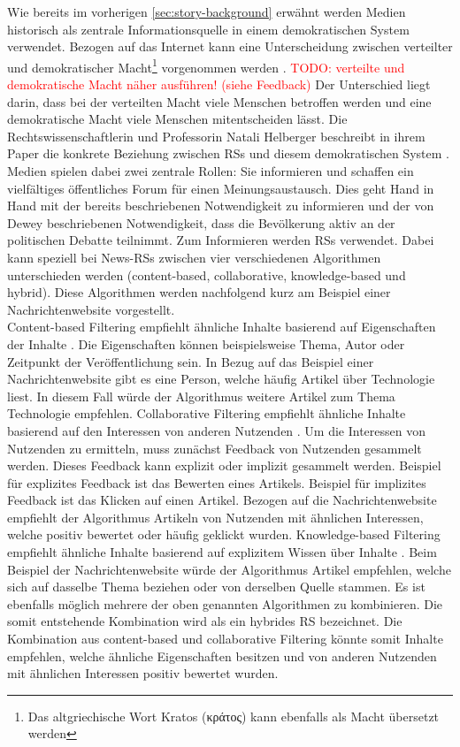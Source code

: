 Wie bereits im vorherigen \autoref{sec:story-background} erwähnt werden Medien historisch als zentrale Informationsquelle in einem demokratischen System verwendet.
Bezogen auf das Internet kann eine Unterscheidung zwischen verteilter und demokratischer Macht\footnote{Das altgriechische Wort Kratos (\textgreek{κράτος}) kann ebenfalls als Macht übersetzt werden} vorgenommen werden \cite{free-speech-algorithmic}.
\textcolor{red}{TODO: verteilte und demokratische Macht näher ausführen! (siehe Feedback)}
Der Unterschied liegt darin, dass bei der verteilten Macht viele Menschen betroffen werden und eine demokratische Macht viele Menschen mitentscheiden lässt.
Die Rechtswissenschaftlerin und Professorin Natali Helberger beschreibt in ihrem Paper die konkrete Beziehung zwischen \acp{RS} und diesem demokratischen System \cite{democratic-role}.
Medien spielen dabei zwei zentrale Rollen: Sie informieren und schaffen ein vielfältiges öffentliches Forum für einen Meinungsaustausch.
Dies geht Hand in Hand mit der bereits beschriebenen Notwendigkeit zu informieren und der von Dewey beschriebenen Notwendigkeit, dass die Bevölkerung aktiv an der politischen Debatte teilnimmt.
Zum Informieren werden \acp{RS} verwendet.
Dabei kann speziell bei News-\acp{RS} zwischen vier verschiedenen Algorithmen unterschieden werden (content-based, collaborative, knowledge-based und hybrid).
Diese Algorithmen werden nachfolgend kurz am Beispiel einer Nachrichtenwebsite vorgestellt. \\

Content-based Filtering empfiehlt ähnliche Inhalte basierend auf Eigenschaften der Inhalte \cite{content-based-rs}.
Die Eigenschaften können beispielsweise Thema, Autor oder Zeitpunkt der Veröffentlichung sein.
In Bezug auf das Beispiel einer Nachrichtenwebsite gibt es eine Person, welche häufig Artikel über Technologie liest.
In diesem Fall würde der Algorithmus weitere Artikel zum Thema Technologie empfehlen.
Collaborative Filtering empfiehlt ähnliche Inhalte basierend auf den Interessen von anderen Nutzenden \cite{collaborative-filtering-rs}.
Um die Interessen von Nutzenden zu ermitteln, muss zunächst Feedback von Nutzenden gesammelt werden.
Dieses Feedback kann explizit oder implizit gesammelt werden.
Beispiel für explizites Feedback ist das Bewerten eines Artikels.
Beispiel für implizites Feedback ist das Klicken auf einen Artikel.
Bezogen auf die Nachrichtenwebsite empfiehlt der Algorithmus Artikeln von Nutzenden mit ähnlichen Interessen, welche positiv bewertet oder häufig geklickt wurden.
Knowledge-based Filtering empfiehlt ähnliche Inhalte basierend auf explizitem Wissen über Inhalte \cite{knowledge-based-rs}.
Beim Beispiel der Nachrichtenwebsite würde der Algorithmus Artikel empfehlen, welche sich auf dasselbe Thema beziehen oder von derselben Quelle stammen.
Es ist ebenfalls möglich mehrere der oben genannten Algorithmen zu kombinieren.
Die somit entstehende Kombination wird als ein hybrides \ac{RS} bezeichnet.
Die Kombination aus content-based und collaborative Filtering könnte somit Inhalte empfehlen, welche ähnliche Eigenschaften besitzen und von anderen Nutzenden mit ähnlichen Interessen positiv bewertet wurden.\\

